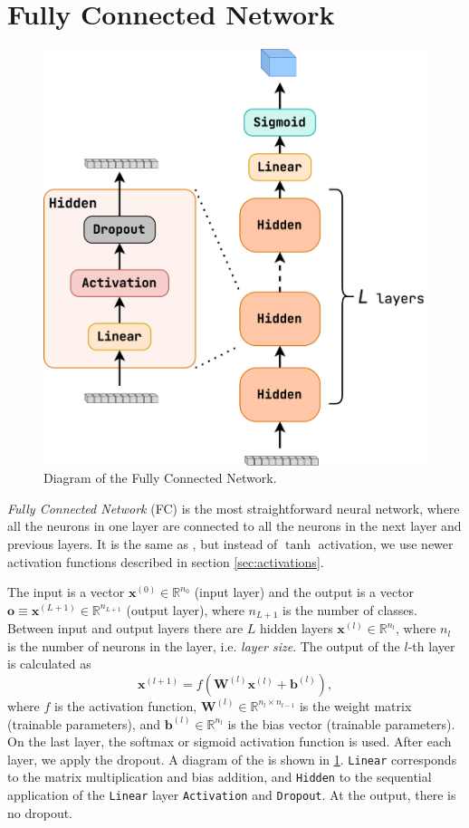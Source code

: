 \section{Fully Connected Network}
\label{sec:fc}
\begin{figure}[htb]
    \centering
    \includegraphics[width=0.6\linewidth]{src/diagrams/fc.png}
    \caption{Diagram of the Fully Connected Network.}
    \label{fig:fc}
\end{figure}

\emph{Fully Connected Network} (FC) \cite{mlp} is the most straightforward neural network, where all the neurons in one layer are connected to all the neurons in the next layer and previous layers.
It is the same as \mlp \cite{mlp}, but instead of $\tanh$ activation, we use newer activation functions described in section \ref{sec:activations}.

The input is a vector $\pmb{x}^{(0)} \in \mathbb{R}^{n_0}$ (input layer) and the output is a vector $\pmb{o} \equiv \pmb{x}^{(L + 1)} \in \mathbb{R}^{n_{L+1}}$ (output layer), where $n_{L+1}$ is the number of classes.
Between input and output layers there are $L$ hidden layers $\pmb{x}^{(l)} \in \mathbb{R}^{n_{l}}$, where $n_{l}$ is the number of neurons in the layer, i.e. \emph{layer size}.
The output of the $l$-th layer is calculated as
\begin{equation}
    \label{eq:hidden}
    \pmb{x}^{(l + 1)} = f(\pmb{W}^{(l)} \pmb{x}^{(l)} + \pmb{b}^{(l)}),
\end{equation}
where $f$ is the activation function, $\pmb{W}^{(l)} \in \mathbb{R}^{n_{l} \times n_{l-1}}$ is the weight matrix (trainable parameters), and $\pmb{b}^{(l)} \in \mathbb{R}^{n_{l}}$ is the bias vector (trainable parameters).
On the last layer, the softmax or sigmoid activation function is used. 
After each layer, we apply the dropout.
A diagram of the \fc is shown in \cref{fig:fc}.
\texttt{Linear} corresponds to the matrix multiplication and bias addition, and \texttt{Hidden} to the sequential application of the \texttt{Linear} layer \texttt{Activation} and \texttt{Dropout}.
At the output, there is no dropout.

